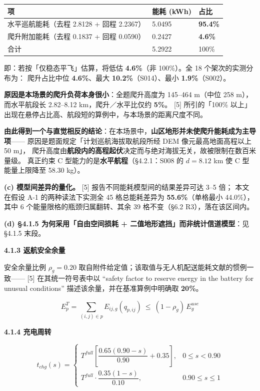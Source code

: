 \documentclass[
  10.5pt,
]{extarticle}
\newcounter{none} %
\begin{document}
{\def\LTcaptype{none} %
\begin{longtable}[]{@{}lll@{}}
\toprule\noalign{}
项 & 能耗 (kWh) & 占比 \\
\midrule\noalign{}
\endhead
\bottomrule\noalign{}
\endlastfoot
水平巡航能耗（去程 2.8128 + 回程 2.2367） & 5.0495 & \textbf{95.4\%} \\
爬升附加能耗（去程 0.1837 + 回程 0.0590） & 0.2427 & \textbf{4.6\%} \\
合计 & 5.2922 & 100\% \\
\end{longtable}
}

即：若按「仅稳态平飞」估算，将低估 \textbf{4.6\%}（非 100\%）。全 18
个架次的实测分布为： 爬升占比中位 \textbf{4.6\%}、最大
\textbf{10.2\%}（S014）、最小 \textbf{1.9\%}（S002）。

\textbf{原因是本场景的爬升负荷本身很小}：全题爬升高度为 145--464 m（中位
258 m）， 而水平航段长 2.82--8.12 km，爬升／水平比仅约 \textbf{5\%}。
{[}5{]} 所引的「100\%
以上」出现在悬停占比高、航段短的算例中，与本场景的距离尺度不同。

\textbf{由此得到一个与直觉相反的结论}：在本场景中，\textbf{山区地形并未使爬升能耗成为主导项}------
原因是题面规定「计划巡航海拔取航段所经 DEM 像元最高地面高程以上 50 m」，
爬升高度由\textbf{航段内的高程起伏}决定而与绝对海拔无关，故被限制在数百米量级。
真正约束 C 型能力的是\textbf{水平航程}（§4.2.1：S008 的 \(d=8.12\) km 使
C 型能量上限降至 58.30 kg）。

\textbf{(c) 模型间差异的量化。} {[}5{]} 报告不同能耗模型间的结果差异可达
3--5 倍； 本文在假设 A-1 的两种读法下实测全 45 格总能耗差异为
\textbf{55.6\%}（单格最小 44.0\%），其中 6
个能量限格的瓶颈归属翻转、其余 39 格不变（§6.2 R3），落在该区间内。

\textbf{(d) §4.1.5 为何采用「自由空间损耗 +
二值地形遮挡」而非统计信道模型}：见 §4.1.5 末段。

\textbf{4.1.3 返航安全余量}

安全余量比例 \(\rho_g=0.20\)
取自附件给定值；该取值与无人机配送能耗文献的惯例一致------ {[}5{]}
在其统一符号表中以 ``safety factor to reserve energy in the battery for
unusual conditions'' 描述该余量，并在基准算例中明确取 \textbf{20\%}。

\[E^T_p=\sum_{(i,j)\in p}E_{ij,g}(q_{p,ij})\ \le\ (1-\rho_g)\,E^{use}_g\]

\textbf{4.1.4 充电周转}

\[t_{chg}(s)=\begin{cases}T^{full}\left[\dfrac{0.65(0.90-s)}{0.90}+0.35\right], & 0\le s<0.90\\ T^{full}\cdot\dfrac{0.35(1-s)}{0.10}, & 0.90\le s\le 1\end{cases}\]
\end{document}
